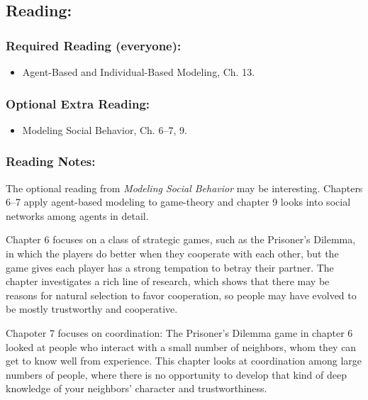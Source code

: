 \documentclass[
]{article}
\providecommand{\tightlist}{%
  \setlength{\itemsep}{0pt}\setlength{\parskip}{0pt}}
\begin{document}
\subsection{Reading:}\label{reading-13}

\subsubsection{Required Reading
(everyone):}\label{required-reading-everyone-12}

\begin{itemize}
\tightlist
\item
  Agent-Based and Individual-Based Modeling, Ch. 13.
\end{itemize}

\subsubsection{Optional Extra Reading:}\label{optional-extra-reading-3}

\begin{itemize}
\tightlist
\item
  Modeling Social Behavior, Ch. 6--7, 9.
\end{itemize}

\subsubsection{Reading Notes:}\label{reading-notes-12}

The optional reading from \emph{Modeling Social Behavior} may be
interesting. Chapters 6--7 apply agent-based modeling to game-theory and
chapter 9 looks into social networks among agents in detail.

Chapter 6 focuses on a class of strategic games, such as the Prisoner's
Dilemma, in which the players do better when they cooperate with each
other, but the game gives each player has a strong tempation to betray
their partner. The chapter investigates a rich line of research, which
shows that there may be reasons for natural selection to favor
cooperation, so people may have evolved to be mostly trustworthy and
cooperative.

Chapoter 7 focuses on coordination: The Prisoner's Dilemma game in
chapter 6 looked at people who interact with a small number of
neighbors, whom they can get to know well from experience. This chapter
looks at coordination among large numbers of people, where there is no
opportunity to develop that kind of deep knowledge of your neighbors'
character and trustworthiness.
\end{document}
